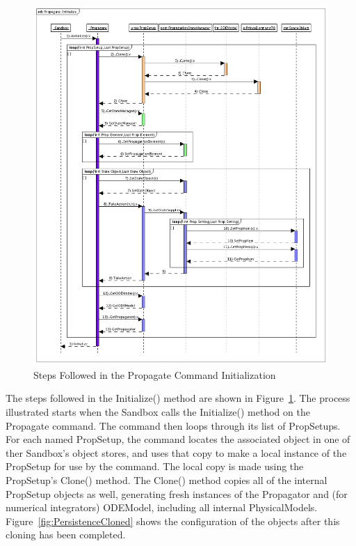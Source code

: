 \documentclass[10pt]{article}
\begin{document}
\begin{figure}[htbp]
   \centering
   \includegraphics[460,560]{Images/PropagateInitialize.png}
   \caption{Steps Followed in the Propagate Command Initialization}
   \label{fig:PropagateInitialize}
\end{figure}

The steps followed in the Initialize() method are shown in Figure~\ref{fig:PropagateInitialize}.
The process illustrated starts when the Sandbox calls the Initialize() method on the Propagate
command. The command then loops through its list of PropSetups.  For each named PropSetup, the
command locates the associated object in one of ther Sandbox's object stores, and uses that copy to
make a local instance of the PropSetup for use by the command.  The local copy is made using the
PropSetup's Clone() method.  The Clone() method copies all of the internal PropSetup objects as
well, generating fresh instances of the Propagator and (for numerical integrators) ODEModel,
including all internal PhysicalModels.  Figure~\ref{fig:PersistenceCloned} shows the configuration
of the objects after this cloning has been completed.
\end{document}
